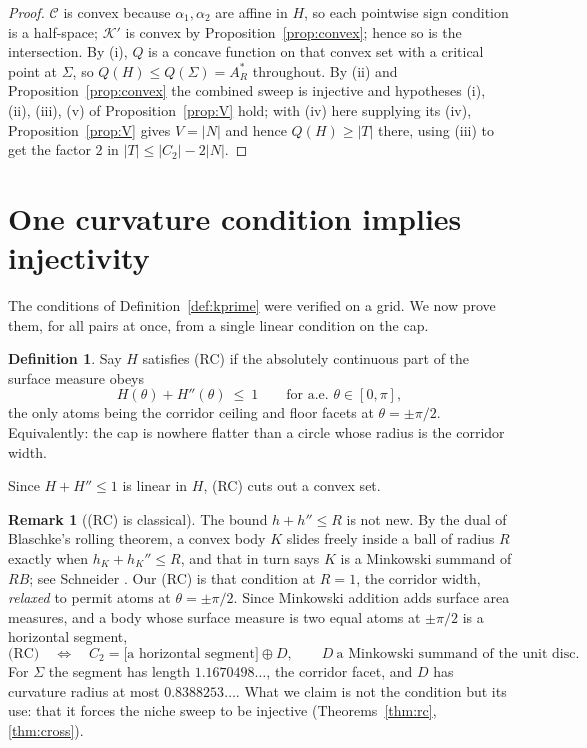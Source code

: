 \documentclass[11pt]{article}
\theoremstyle{definition}
\newtheorem{remark}[theorem]{Remark}
\newtheorem{definition}[theorem]{Definition}
\newcommand{\Sig}{\Sigma}
\begin{document}
\begin{proof}
$\mathcal C$ is convex because $\alpha_1,\alpha_2$ are affine in $H$, so each pointwise
sign condition is a half-space; $\mathcal K'$ is convex by
Proposition~\ref{prop:convex}; hence so is the intersection. By (i), $Q$ is a concave
function on that convex set with a critical point at $\Sig$, so
$Q(H)\le Q(\Sig)=A_R^\ast$ throughout. By (ii) and Proposition~\ref{prop:convex} the combined
sweep is injective and hypotheses (i), (ii), (iii), (v) of Proposition~\ref{prop:V} hold;
with (iv) here supplying its (iv), Proposition~\ref{prop:V} gives $V=|N|$ and hence
$Q(H)\ge|T|$ there, using (iii) to get the factor $2$ in $|T|\le|C_2|-2|N|$.
\end{proof}

\section{One curvature condition implies injectivity}\label{sec:rc}

The conditions of Definition~\ref{def:kprime} were verified on a grid. We now prove them,
for all pairs at once, from a single linear condition on the cap.

\begin{definition}\label{def:rc}
Say $H$ satisfies (RC) if the absolutely continuous part of the surface measure obeys
\[
  H(\theta)+H''(\theta)\ \le\ 1\qquad\text{for a.e. }\theta\in[0,\pi],
\]
the only atoms being the corridor ceiling and floor facets at $\theta=\pm\pi/2$.
Equivalently: the cap is nowhere flatter than a circle whose radius is the corridor
width.
\end{definition}

Since $H+H''\le1$ is linear in $H$, (RC) cuts out a convex set.

\begin{remark}[(RC) is classical]\label{rem:rcclassical}
The bound $h+h''\le R$ is not new. By the dual of Blaschke's rolling theorem, a convex
body $K$ slides freely inside a ball of radius $R$ exactly when $h_K+h_K''\le R$, and
that in turn says $K$ is a Minkowski summand of $RB$; see
Schneider \cite[\S3.2]{Sch14}. Our (RC) is that condition at $R=1$, the corridor width,
\emph{relaxed} to permit atoms at $\theta=\pm\pi/2$. Since Minkowski addition adds surface
area measures, and a body whose surface measure is two equal atoms at $\pm\pi/2$ is a
horizontal segment,
\[
  \text{(RC)}\quad\Longleftrightarrow\quad
  C_2=\bigl[\text{a horizontal segment}\bigr]\oplus D,\qquad
  D\ \text{a Minkowski summand of the unit disc.}
\]
For $\Sig$ the segment has length $1.1670498\ldots$, the corridor facet, and $D$ has
curvature radius at most $0.8388253\ldots$. What we claim is not the condition but its use: that it
forces the niche sweep to be injective (Theorems~\ref{thm:rc}, \ref{thm:cross}).
\end{remark}
\end{document}
